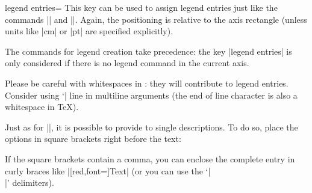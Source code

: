 \begin{pgfplotskey}{legend entries=}
    This key can be used to assign legend entries just like the commands
    |\addlegendentry| and |\legend|. Again, the positioning is relative to the
    axis rectangle (unless units like |cm| or |pt| are specified explicitly).
\begin{codeexample}[]
\end{codeexample}

    The commands for legend creation take precedence: the key |legend entries|
    is only considered if there is no legend command in the current axis.
\begin{codeexample}[]
\end{codeexample}
    Please be careful with whitespaces in : they
    will contribute to legend entries. Consider using `|%
    line in multiline arguments (the end of line character is also a whitespace
    in \TeX{}).

    Just as for |\addlegendentry|, it is possible to provide  to
    single descriptions. To do so, place the options in square brackets right
    before the text:
\begin{codeexample}[]
\end{codeexample}
    If the square brackets contain a comma, you can enclose the complete entry
    in curly braces like |{[red,font=\Huge]Text}| (or you can use the `|\\|'
    delimiters).
\end{pgfplotskey}


